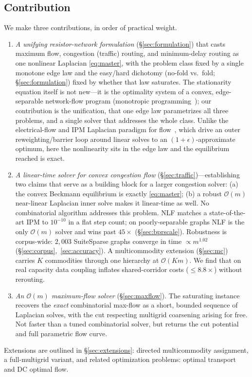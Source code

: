 \documentclass{siamart220329}
\newcommand{\Om}{\mathcal{O}(m)}
\begin{document}
\subsection{Contribution}\label{sec:contrib}
We make three contributions, in order of practical weight.
\begin{enumerate}[leftmargin=1.6em,itemsep=1pt]
\item \emph{A unifying resistor-network formulation} (\S\ref{sec:formulation}) that casts maximum
flow, congestion (traffic) routing, and minimum-delay routing as one nonlinear Laplacian
\eqref{eq:master}, with the problem class fixed by a single monotone edge law and the easy/hard
dichotomy (no-fold vs.\ fold; \S\ref{sec:formulation}) fixed by whether that law saturates. The stationarity equation itself
is not new---it is the optimality system of a convex, edge-separable network-flow program (monotropic
programming~\cite{rockafellar-monotropic}); our contribution is the unification, that one edge law
parametrizes all three problems, and a single solver
that addresses the whole class.
Unlike the electrical-flow and IPM Laplacian paradigm for flow~\cite{christiano-etal,daitch-spielman},
which drive an outer reweighting/barrier loop around linear solves to an $(1+\epsilon)$-approximate
optimum, here the nonlinearity sits in the edge law and the equilibrium reached is exact.
\item \emph{A linear-time solver for convex congestion flow} (\S\ref{sec:traffic})---establishing
two claims that serve as a building block for a larger congestion solver: (a) the convex Beckmann equilibrium is
exactly \eqref{eq:master}; (b) a robust $\Om$ near-linear Laplacian inner solve makes it
linear-time as well. No combinatorial algorithm addresses this problem. NLF matches a state-of-the-art IPM
to $10^{-10}$ in a flat step count; on poorly-separable graphs NLF is the only $\Om$ solver and wins
past $45\times$ (\S\ref{sec:bprscale}). Robustness is corpus-wide: $2{,}003$ SuiteSparse graphs
converge in time $\propto m^{1.02}$
(\S\ref{sec:corpus},~\ref{sec:accuracy}). A multicommodity extension (\S\ref{sec:mc}) carries $K$
commodities through one hierarchy at $\mathcal{O}(Km)$. We find that on real capacity data coupling inflates
shared-corridor costs (${\le}8.8\times$) without rerouting.
\item \emph{An $\Om$ maximum-flow solver} (\S\ref{sec:maxflow}). The saturating instance recovers the
\emph{exact} combinatorial max-flow as a short, bounded sequence of Laplacian solves, with
the cut respecting multigrid coarsening arising for free. Not faster than a tuned combinatorial solver,
but returns the cut potential and full parametric flow curve.
\end{enumerate}
Extensions are outlined in
\S\ref{sec:extensions}: directed multicommodity assignment, a full-multigrid variant, and related optimization problems: optimal transport and DC optimal flow.
\end{document}
